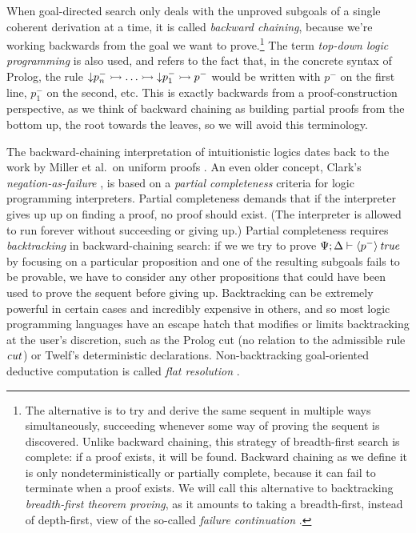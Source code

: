 When goal-directed search only deals with the unproved subgoals of a
single coherent derivation at a time, it is called {\it backward
  chaining}, because we're working backwards from the goal we want to
prove.\footnote{The alternative is to try and derive the same sequent
  in multiple ways simultaneously, succeeding whenever some way of
  proving the sequent is discovered. Unlike backward chaining, this
  strategy of breadth-first search is complete: if a proof exists, it
  will be found.  Backward chaining as we define it is only
  nondeterministically or partially complete, because it can fail to
  terminate when a proof exists. We will call this alternative to
  backtracking {\it breadth-first theorem proving}, as it amounts to
  taking a breadth-first, instead of depth-first, view of the
  so-called {\it failure continuation} \cite{pfenning06backtracking}.}
The term {\it top-down logic programming} is also used, and refers to
the fact that, in the concrete syntax of Prolog, the rule
${\downarrow}p_n^- \rightarrowtail \ldots \rightarrowtail {\downarrow}p_1^- \rightarrowtail p^-$
would be written with $p^-$ on the first line, $p_1^-$ on the second,
etc. This is exactly backwards from a proof-construction perspective,
as we think of backward chaining as building partial proofs from the
bottom up, the root towards the leaves, so we will avoid this
terminology.

The backward-chaining interpretation of intuitionistic logics dates
back to the work by Miller et al.~on uniform proofs
\cite{miller91uniform}.  An even older concept, Clark's {\it
  negation-as-failure} \cite{clark87negation}, is based on a {\it
  partial completeness} criteria for logic programming interpreters.
Partial completeness 
demands that if the interpreter gives up up on finding a proof,
no proof should exist. (The interpreter is allowed to run forever
without succeeding or giving up.)  Partial completeness requires {\it
  backtracking} in backward-chaining search: if we we try to prove
${\Psi};{\Delta} \vdash {{\langle {p^-} \rangle}\,{{\it true}}} \mathstrut$ by focusing on a particular
proposition and one of the resulting subgoals fails to be provable, we
have to consider any other propositions that could have been used to
prove the sequent before giving up. Backtracking can be extremely
powerful in certain cases and incredibly expensive in others, and so
most logic programming languages have an escape hatch that modifies or
limits backtracking at the user's discretion, such as the Prolog cut
(no relation to the admissible rule ${\it cut}$) or Twelf's
deterministic declarations. Non-backtracking goal-oriented deductive
computation is called {\it flat resolution} \cite{aitkaci99warrens}.

